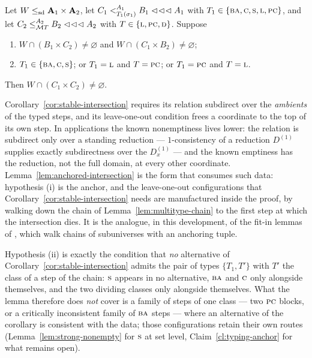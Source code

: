 \begin{lemma}\label{lem:anchored-intersection}
Let $W\sdle\mathbf A_{1}\times\mathbf A_{2}$, let
$C_{1}\subt[A_{1}]{T_{1}(\sigma_{1})}B_{1}\lll A_{1}$ with
$T_{1}\in\{\TBA,\TC,\TS,\TL,\TPC\}$, and let
$C_{2}\subte[A_{2}]{\MT T}B_{2}\lll A_{2}$ with $T\in\{\TL,\TPC,\TD\}$.
Suppose
\begin{enumerate}\romanlabels\tightlist
\item $W\cap(B_{1}\times C_{2})\neq\varnothing$ and
  $W\cap(C_{1}\times B_{2})\neq\varnothing$;
\item $T_{1}\in\{\TBA,\TC,\TS\}$; or $T_{1}=\TL$ and $T=\TPC$; or
  $T_{1}=\TPC$ and $T=\TL$.
\end{enumerate}
Then $W\cap(C_{1}\times C_{2})\neq\varnothing$.
\end{lemma}

\begin{hazard}\label{haz:anchored}
Corollary~\ref{cor:stable-intersection} requires its relation subdirect over
the \emph{ambients} of the typed steps, and its leave-one-out condition frees
a coordinate to the top of its own step. In applications the known
nonemptiness lives lower: the relation is subdirect only over a standing
reduction --- $1$-consistency of a reduction $D^{(1)}$ supplies exactly
subdirectness over the $D^{(1)}_{x}$ --- and the known emptiness has the
reduction, not the full domain, at every other coordinate.
Lemma~\ref{lem:anchored-intersection} is the form that consumes such data:
hypothesis (i) is the anchor, and the leave-one-out configurations that
Corollary~\ref{cor:stable-intersection} needs are manufactured inside the
proof, by walking down the chain of Lemma~\ref{lem:multitype-chain} to the
first step at which the intersection dies. It is the analogue, in this
development, of the fit-in lemmas of \cite{ZhukJACM}, which walk chains of
subuniverses with an anchoring tuple.

Hypothesis (ii) is exactly the condition that \emph{no} alternative of
Corollary~\ref{cor:stable-intersection} admits the pair of types
$\{T_{1},T'\}$ with $T'$ the class of a step of the chain: $\TS$ appears in
no alternative, $\TBA$ and $\TC$ only alongside themselves, and the two
dividing classes only alongside themselves. What the lemma therefore does
\emph{not} cover is a family of steps of one class --- two $\TPC$ blocks, or
a critically inconsistent family of $\TBA$ steps --- where an alternative of
the corollary is consistent with the data; those configurations retain their
own routes (Lemma~\ref{lem:strong-nonempty} for $\TS$ at set level,
Claim~\ref{cl:typing-anchor} for what remains open).
\end{hazard}

